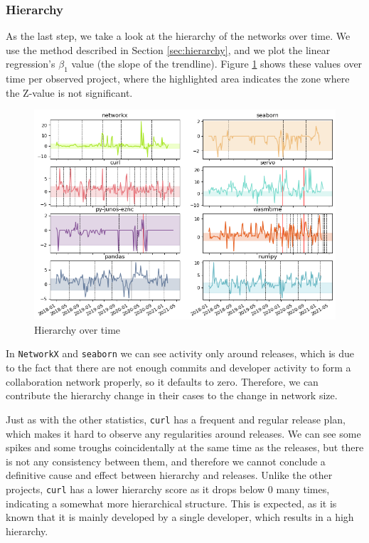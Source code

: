 \subsubsection{Hierarchy}

As the last step, we take a look at the hierarchy of the networks over time. We use the method described in Section \ref{sec:hierarchy}, and we plot the linear regression's $\beta_1$ value (the slope of the trendline). Figure \ref{fig:hierarchy_all} shows these values over time per observed project, where the highlighted area indicates the zone where the Z-value is not significant.

\begin{figure}[!htbp]
    \centering
    \includegraphics[width=\textwidth]{figures/qualitative/hierarchy/hierarchy_all_z.png}
    \caption{Hierarchy over time}
    \label{fig:hierarchy_all}
\end{figure}

In \texttt{NetworkX} and \texttt{seaborn} we can see activity only around releases, which is due to the fact that there are not enough commits and developer activity to form a collaboration network properly, so it defaults to zero. Therefore, we can contribute the hierarchy change in their cases to the change in network size.

Just as with the other statistics, \texttt{curl} has a frequent and regular release plan, which makes it hard to observe any regularities around releases. We can see some spikes and some troughs coincidentally at the same time as the releases, but there is not any consistency between them, and therefore we cannot conclude a definitive cause and effect between hierarchy and releases. Unlike the other projects, \texttt{curl} has a lower hierarchy score as it drops below $0$ many times, indicating a somewhat more hierarchical structure. This is expected, as it is known that it is mainly developed by a single developer, which results in a high hierarchy.

